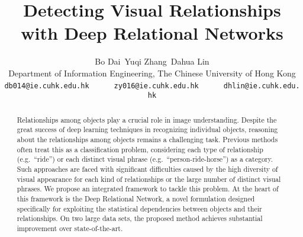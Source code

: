 \documentclass[10pt,twocolumn,letterpaper]{article}
\begin{document}
\title{Detecting Visual Relationships with Deep Relational Networks}

\author{Bo Dai\qquad\qquad~Yuqi Zhang\qquad\qquad~Dahua Lin\\
Department of Information Engineering, The Chinese University of Hong Kong\\
{\footnotesize\texttt{db014@ie.cuhk.edu.hk}~~~~~~\texttt{zy016@ie.cuhk.edu.hk}~~~~~~\texttt{dhlin@ie.cuhk.edu.hk}}
}

\maketitle
\begin{abstract}
Relationships among objects play a crucial role in image understanding.
Despite the great success of deep learning techniques in recognizing 
individual objects, reasoning about the relationships among objects
remains a challenging task.
%
Previous methods often treat this as a classification problem,
considering each type of relationship (e.g.~``ride'') or each distinct
visual phrase (e.g.~``person-ride-horse'') as a category.
%
Such approaches are faced with significant difficulties caused by
the high diversity of visual appearance for each kind of relationships
or the large number of distinct visual phrases. 
%
We propose an integrated framework to tackle this problem.
At the heart of this framework is the Deep Relational Network,
a novel formulation designed specifically for exploiting the 
statistical dependencies between objects and their relationships. 
%
On two large data sets, the proposed method achieves substantial 
improvement over state-of-the-art. 
\end{abstract}
\end{document}
